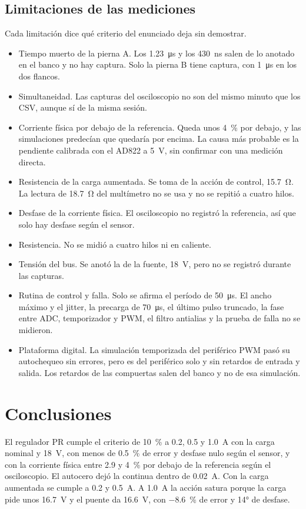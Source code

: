 \documentclass[journal]{IEEEtran}
\begin{document}
\subsection{Limitaciones de las mediciones}
Cada limitación dice qué criterio del enunciado deja sin demostrar.
\begin{itemize}
	\item Tiempo muerto de la pierna A. Los \SI{1.23}{\micro s} y los \SI{430}{ns} salen de lo anotado en el banco y no hay captura. Solo la pierna B tiene captura, con \SI{1}{\micro s} en los dos flancos.
	\item Simultaneidad. Las capturas del osciloscopio no son del mismo minuto que los CSV, aunque sí de la misma sesión.
	\item Corriente física por debajo de la referencia. Queda unos \SI{4}{\percent} por debajo, y las simulaciones predecían que quedaría por encima. La causa más probable es la pendiente calibrada con el AD822 a \SI{5}{V}, sin confirmar con una medición directa.
	\item Resistencia de la carga aumentada. Se toma de la acción de control, \SI{15.7}{\ohm}. La lectura de \SI{18.7}{\ohm} del multímetro no se usa y no se repitió a cuatro hilos.
	\item Desfase de la corriente física. El osciloscopio no registró la referencia, así que solo hay desfase según el sensor.
	\item Resistencia. No se midió a cuatro hilos ni en caliente.
	\item Tensión del bus. Se anotó la de la fuente, \SI{18}{V}, pero no se registró durante las capturas.
	\item Rutina de control y falla. Solo se afirma el período de \SI{50}{\micro s}. El ancho máximo y el jitter, la precarga de \SI{70}{\micro s}, el último pulso truncado, la fase entre ADC, temporizador y PWM, el filtro antialias y la prueba de falla no se midieron.
	\item Plataforma digital. La simulación temporizada del periférico PWM pasó su autochequeo sin errores, pero es del periférico solo y sin retardos de entrada y salida. Los retardos de las compuertas salen del banco y no de esa simulación.
\end{itemize}

\section{Conclusiones}
\label{sec:conclusiones}
El regulador PR cumple el criterio de \SI{10}{\percent} a \num{0.2}, \num{0.5} y \SI{1.0}{A} con la carga nominal y \SI{18}{V}, con menos de \SI{0.5}{\percent} de error y desfase nulo según el sensor, y con la corriente física entre \num{2.9} y \SI{4}{\percent} por debajo de la referencia según el osciloscopio. El autocero dejó la continua dentro de \SI{0.02}{A}. Con la carga aumentada se cumple a \num{0.2} y \SI{0.5}{A}. A \SI{1.0}{A} la acción satura porque la carga pide unos \SI{16.7}{V} y el puente da \SI{16.6}{V}, con \SI{-8.6}{\percent} de error y \ang{14} de desfase.
\end{document}
